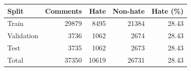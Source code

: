 \begin{tabular}{lrrrr}
\toprule
Split & Comments & Hate & Non-hate & Hate (\%) \\
\midrule
Train & 29879 & 8495 & 21384 & 28.43 \\
Validation & 3736 & 1062 & 2674 & 28.43 \\
Test & 3735 & 1062 & 2673 & 28.43 \\
Total & 37350 & 10619 & 26731 & 28.43 \\
\bottomrule
\end{tabular}

